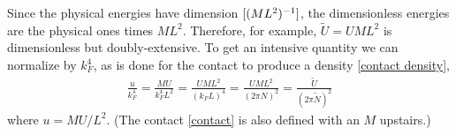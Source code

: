 Since the physical energies have dimension $[(ML^2)^{-1}]$, the dimensionless energies are the physical ones times $ML^2$.
Therefore, for example, $\tilde{U} = U ML^2$ is dimensionless but doubly-extensive.
To get an intensive quantity we can normalize by $k_F^4$, as is done for the contact to produce a density \eqref{contact density},
\begin{align}
	\frac{u}{k_F^4} = \frac{MU}{k_F^4 L^2} = \frac{UML^2}{(k_F L)^4} = \frac{UML^2}{(2\pi N)^2} = \frac{\tilde{U}}{(2\pi\tilde{N})^2}
	\label{eq:internal energy density}
\end{align}
where $u=MU/L^2$.  (The contact \eqref{contact} is also defined with an $M$ upstairs.)
